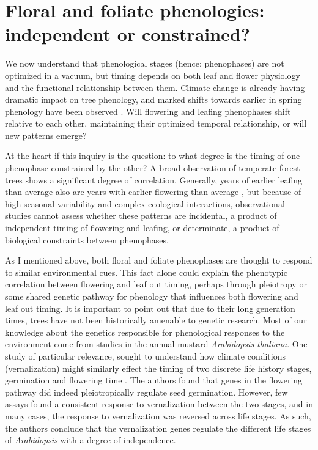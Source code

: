 \documentclass{article}\usepackage[]{graphicx}\usepackage[]{color}
\begin{document}
\section{Floral and foliate phenologies: independent or constrained?}
\par We now understand that phenological stages (hence: phenophases) are not optimized in a vacuum, but timing depends on both leaf and flower physiology and the functional relationship between them. Climate change is already having dramatic impact on tree phenology, and marked shifts towards earlier in spring phenology have been observed \citep{Wolkovich2012}. Will flowering and leafing phenophases shift relative to each other, maintaining their optimized temporal relationship, or will new patterns emerge?
\par At the heart if this inquiry is the question: to what degree is the timing of one phenophase constrained by the other? A broad observation of temperate forest trees shows a significant degree of correlation. Generally, years of earlier leafing than average also are years with earlier flowering than average \citep{Lechowicz1995}, but because of high seasonal variability and complex ecological interactions, observational studies cannot assess whether these patterns are incidental, a product of independent timing of flowering and leafing, or determinate, a product of biological constraints between phenophases. 
\par As I mentioned above, both floral and foliate phenophases are thought to respond to similar environmental cues. This fact alone could explain the phenotypic correlation between flowering and leaf out timing, perhaps through pleiotropy or some shared genetic pathway for phenology that influences both flowering and leaf out timing. It is important to point out that due to their long generation times, trees have not been historically amenable to genetic research. Most of our knowledge about the genetics responsible for phenological responses to the environment come from studies in the annual mustard \textit{Arabidopsis thaliana}. One study of particular relevance, sought to understand how climate conditions (vernalization) might similarly effect the timing of two discrete life history stages, germination and flowering time \citep{Auge2017}. The authors found that genes in the flowering pathway did indeed pleiotropically regulate seed germination. However, few assays found a consistent response to vernalization between the two stages, and in many cases, the response to vernalization was reversed across life stages. As such, the authors conclude that the vernalization genes regulate the different life stages of \textit{Arabidopsis} with a degree of independence. 
\end{document}
